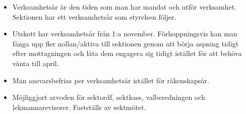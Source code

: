 \documentclass[a4paper]{dteklag}
\begin{document}
\begin{itemize}
  \item Verksamhetsår är den tiden som man har mandat och utför verksamhet. Sektionen har ett verksamhetsår som styrelsen följer.
  \item Utskott har verksamhetsår från 1:a november. Förhoppningsvis kan man fånga upp fler nollan/aktiva till sektionen genom att börja aspning tidigt efter mottagningen och låta dem engagera sig tidigt istället för att behöva vänta till april.
  \item Man ansvarsbefrias per verksamhetsår istället för räkenskapsår.
  \item Möjliggjort arvoden för sektordf, sektkass, valberedningen  och lekmannarevisorer. Fastställs av sektmötet.
\end{itemize}
\end{document}

